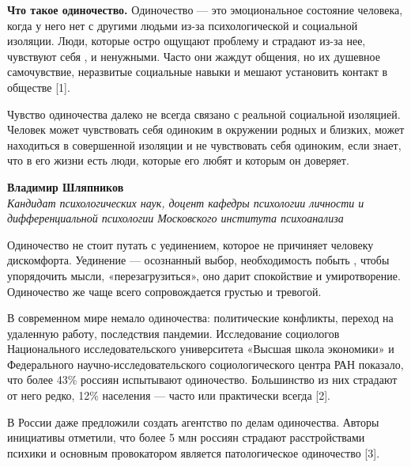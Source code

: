 \textbf{Что такое одиночество.}
Одиночество --- это эмоциональное состояние человека,
когда у него нет
с другими людьми из-за психологической и социальной изоляции.
Люди, которые остро ощущают проблему и страдают из-за нее,
чувствуют себя ,
 и ненужными.
Часто они жаждут общения, но их душевное самочувствие,
неразвитые социальные навыки и  мешают установить
контакт в обществе [1].

\begin{fancyquotes}
    Чувство одиночества далеко не всегда связано с реальной социальной
    изоляцией. Человек может чувствовать себя одиноким в окружении родных
    и близких, может находиться в совершенной изоляции и не чувствовать себя
    одиноким, если знает, что в его жизни есть люди, которые его любят
    и которым он доверяет.

    \begin{flushright}
        \textbf{Владимир Шляпников}\\
        \textit{Кандидат психологических наук, доцент кафедры психологии
            личности и дифференциальной психологии Московского института
            психоанализа}
    \end{flushright}
\end{fancyquotes}

Одиночество не стоит путать с уединением, которое не причиняет
человеку дискомфорта. Уединение --- осознанный выбор, необходимость
побыть ,
чтобы упорядочить мысли, «перезагрузиться»,
оно дарит спокойствие и умиротворение.
Одиночество же чаще всего сопровождается грустью и тревогой.

В современном мире немало 
 одиночества:
политические конфликты, переход на удаленную работу,
последствия пандемии.
Исследование социологов Национального исследовательского университета
«Высшая школа экономики» и Федерального научно-исследовательского
социологического центра РАН показало, что более 43\% россиян испытывают
одиночество.
Большинство из них страдают от него редко, 12\% населения
--- часто или практически всегда [2].

В России даже предложили создать агентство по делам одиночества.
Авторы инициативы отметили, что более 5 млн россиян страдают расстройствами
психики и основным провокатором является патологическое одиночество [3].

